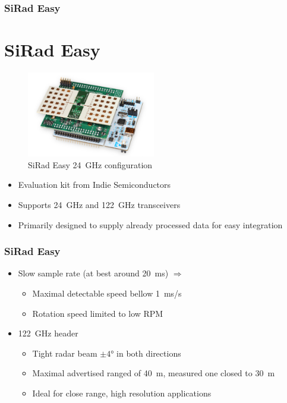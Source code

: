 \documentclass[aspectratio=43]{beamer}
\begin{document}
\begin{frame}[fragile]
  \frametitle{SiRad Easy}
  \section{SiRad Easy}

  \begin{figure}[h!]
    \centering
    \includegraphics[width=0.5\textwidth]{../img/sirad.png}

    \caption{SiRad Easy  24~GHz configuration }
    \label{fig:sirad}
  \end{figure}

  \begin{itemize}
    \item Evaluation kit from Indie Semiconductors
    \item Supports 24~GHz and 122~GHz transceivers
    \item Primarily designed to supply already processed data for easy integration
  \end{itemize}
\end{frame}

\begin{frame}[fragile]
  \frametitle{SiRad Easy}

  \begin{itemize}
    \item Slow sample rate (at best around 20~ms) $\Rightarrow$
      \begin{itemize}
        \item Maximal detectable speed bellow 1~ms/s
        \item Rotation speed limited to low RPM
      \end{itemize}
    \item 122~GHz header
      \begin{itemize}
        \item Tight radar beam $\pm 4$° in both directions
        \item Maximal advertised ranged of 40~m, measured one closed to 30~m
        \item Ideal for close range, high resolution applications
      \end{itemize}
  \end{itemize}
\end{frame}
\end{document}
